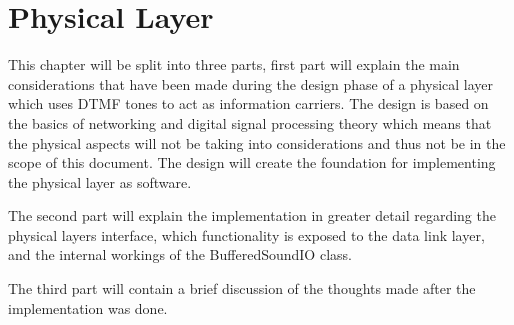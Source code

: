 \chapter{Physical Layer}\label{chap:physical}
This chapter will be split into three parts, first part will explain the main considerations that have been made during the design phase of a physical layer which uses DTMF tones to act as information carriers. The design is based on the basics of networking and digital signal processing theory which means that the physical aspects will not be taking into considerations and thus not be in the scope of this document. The design will create the foundation for implementing the physical layer as software.

The second part will explain the implementation in greater detail regarding the physical layers interface, which functionality is exposed to the data link layer, and the internal workings of the BufferedSoundIO class.

The third part will contain a brief discussion of the thoughts made after the implementation was done.

